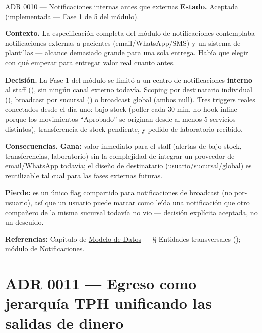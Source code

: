 \begin{cajaADR}{ADR 0010 --- Notificaciones internas antes que externas}
\textbf{Estado.} Aceptada (implementada --- Fase 1 de 5 del módulo).

\textbf{Contexto.} La especificación completa del módulo de notificaciones contemplaba notificaciones externas a pacientes (email/WhatsApp/SMS) y un sistema de plantillas --- alcance demasiado grande para una sola entrega. Había que elegir con qué empezar para entregar valor real cuanto antes.

\textbf{Decisión.} La Fase 1 del módulo se limitó a un centro de notificaciones \textbf{interno} al staff (\allowbreak {}), sin ningún canal externo todavía. Scoping por destinatario individual (\allowbreak {}\allowbreak {}), broadcast por sucursal (\allowbreak {}\allowbreak {}) o broadcast global (ambos null). Tres triggers reales conectados desde el día uno: bajo stock (poller  cada 30 min, no hook inline --- porque los movimientos ``Aprobado'' se originan desde al menos 5 servicios distintos), transferencia de stock pendiente, y pedido de laboratorio recibido.

\textbf{Consecuencias.} \textbf{Gana:} valor inmediato para el staff (alertas de bajo stock, transferencias, laboratorio) sin la complejidad de integrar un proveedor de email/WhatsApp todavía; el diseño de destinatario (usuario/sucursal/global) es reutilizable tal cual para las fases externas futuras.

\textbf{Pierde:}  es un único flag compartido para notificaciones de broadcast (no por-usuario), así que un usuario puede marcar como leída una notificación que otro compañero de la misma sucursal todavía no vio --- decisión explícita aceptada, no un descuido.
\end{cajaADR}

\textbf{Referencias:} Capítulo de \hyperref[sec:modelo-datos]{Modelo de Datos} --- § Entidades transversales (\allowbreak {}); \hyperref[mod:13-notificaciones]{módulo de Notificaciones}.

\section{ADR 0011 --- Egreso como jerarquía TPH unificando las salidas de dinero}
\label{adr:0011}

